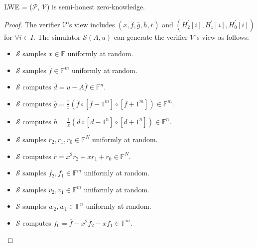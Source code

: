 \begin{lemma}
\label{lemma:lwezk}

LWE = ($\mathcal{P}$, $\mathcal{V}$) is semi-honest zero-knowledge.

\end{lemma}
\begin{proof}

The  verifier $\mathcal{V}$'s view includes $(x, \overline{f}, \overline{g}, \overline{h}, \overline{r})$ and $(H_2^\prime[i], H_1^\prime[i], H_0^\prime[i])$ for $\forall i \in I$. The simulator $\mathcal{S}(A, u)$ can generate the verifier $\mathcal{V}$'s view as follows:

\begin{itemize}

    \item $\mathcal{S}$ samples $x \in \mathbb{F}$ uniformly at random.

    \item $\mathcal{S}$ samples $\overline{f} \in \mathbb{F}^m$ uniformly at random.
    
    \item $\mathcal{S}$ computes $\overline{d} = u - A\overline{f} \in \mathbb{F}^n$.
    
    \item $\mathcal{S}$ computes $\overline{g} = \frac{1}{x} (\overline{f} \circ [\overline{f} - 1^m] \circ [\overline{f} + 1^m]) \in \mathbb{F}^m$.
    
    \item $\mathcal{S}$ computes $\overline{h} = \frac{1}{x} (\overline{d} \circ [\overline{d} - 1^n] \circ [\overline{d} + 1^n]) \in \mathbb{F}^n$.
    
    \item $\mathcal{S}$ samples $r_2, r_1, r_0 \in \mathbb{F}^N$ uniformly at random.
    
    \item $\mathcal{S}$ computes $\overline{r} = x^2 r_2 + x r_1 + r_0 \in \mathbb{F}^N$.

    \item $\mathcal{S}$ samples $f_2, f_1 \in \mathbb{F}^m$ uniformly at random.

    \item $\mathcal{S}$ samples $v_2, v_1 \in \mathbb{F}^m$ uniformly at random.
    
    \item $\mathcal{S}$ samples $w_2, w_1 \in \mathbb{F}^n$ uniformly at random.
    
    \item $\mathcal{S}$ computes $f_0 = \overline{f} - x^2 f_2 - x f_1 \in \mathbb{F}^m$.
    

\end{itemize}
\end{proof}
